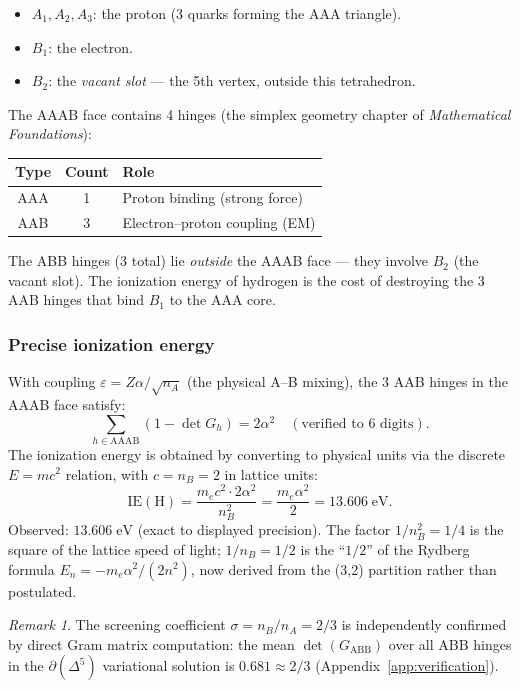 \documentclass[12pt]{article}
\theoremstyle{remark}
\newtheorem{remark}[theorem]{Remark}
\theoremstyle{definition}
\begin{document}
\begin{itemize}
\item $A_1, A_2, A_3$: the proton (3 quarks forming the AAA triangle).
\item $B_1$: the electron.
\item $B_2$: the \emph{vacant slot} --- the 5th vertex, outside this tetrahedron.
\end{itemize}

The AAAB face contains 4 hinges (the simplex geometry chapter of \textit{Mathematical Foundations}):
\begin{center}
\begin{tabular}{ccl}
\hline
Type & Count & Role \\
\hline
AAA & 1 & Proton binding (strong force) \\
AAB & 3 & Electron--proton coupling (EM) \\
\hline
\end{tabular}
\end{center}

The ABB hinges (3 total) lie \emph{outside} the AAAB face --- they involve $B_2$ (the vacant slot). The ionization energy of hydrogen is the cost of destroying the 3 AAB hinges that bind $B_1$ to the AAA core.

\subsubsection{Precise ionization energy}

With coupling $\varepsilon = Z\alpha/\sqrt{n_A}$ (the physical A--B mixing), the 3 AAB hinges in the AAAB face satisfy:
\begin{equation}
\sum_{h \in \mathrm{AAAB}}(1 - \det G_h) = 2\alpha^2
\quad (\text{verified to 6 digits}).
\end{equation}
The ionization energy is obtained by converting to physical units via the discrete $E = mc^2$ relation, with $c = n_B = 2$ in lattice units:
\begin{equation}
\boxed{\text{IE}(\text{H}) = \frac{m_e c^2 \cdot 2\alpha^2}{n_B^2} = \frac{m_e \alpha^2}{2} = 13.606\;\text{eV}.}
\end{equation}
Observed: $13.606\;\text{eV}$ (exact to displayed precision).  The factor $1/n_B^2 = 1/4$ is the square of the lattice speed of light; $1/n_B = 1/2$ is the ``$1/2$'' of the Rydberg formula $E_n = -m_e\alpha^2/(2n^2)$, now derived from the (3,2) partition rather than postulated.

\begin{remark}
The screening coefficient $\sigma = n_B/n_A = 2/3$ is independently confirmed by direct Gram matrix computation: the mean $\det(G_\mathrm{ABB})$ over all ABB hinges in the $\partial(\Delta^5)$ variational solution is $0.681 \approx 2/3$ (Appendix~\ref{app:verification}).
\end{remark}
\end{document}
